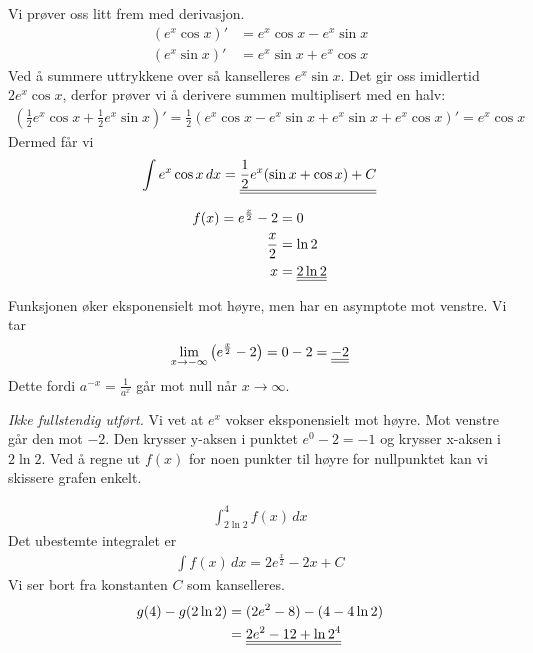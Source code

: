 \documentclass[a4paper,norsk,12pt]{article}
\begin{document}
Vi prøver oss litt frem med derivasjon.
\begin{align*}
  (e^x \cos{x})' &= e^x\cos{x} - e^x\sin{x} \\
  (e^x \sin{x})' &= e^x\sin{x} + e^x\cos{x}
\end{align*}
Ved å summere uttrykkene over så kanselleres $e^x\sin{x}$. Det gir oss
imidlertid $2e^x\cos{x}$, derfor prøver vi å derivere summen multiplisert med
en halv:
\begin{align*}
  \left( \frac{1}{2}e^x \cos{x} +
         \frac{1}{2}e^x \sin{x} \right)' =
    \frac{1}{2} \left( 
        e^x\cos{x}-e^x\sin{x} + e^x\sin{x} + e^x\cos{x}
      \right)' = e^x\cos{x}
\end{align*}
Dermed får vi
\begin{align*}
  \int{e^x\cos{x}} \,dx = 
  {\underline{\underline{ \frac{1}{2}e^x( \sin{x} + \cos{x} ) + C }}}
\end{align*}


\begin{align*}
  f(x) = e^\frac{x}{2} - 2 &= 0 \\
  \frac{x}{2} &= \ln{2} \\
  x &= {\underline{\underline{ 2\ln{2} }}}
\end{align*}

Funksjonen øker eksponensielt mot høyre, men har en asymptote mot venstre. Vi
tar
\begin{align*}
  \lim_{x\to -\infty}{\left( e^\frac{x}{2}-2 \right)} = 0 - 2 = {\underline{\underline{-2}}}
\end{align*}
Dette fordi $a^{-x} = \frac{1}{a^x}$ går mot null når $x\to\infty$.

\textit{Ikke fullstendig utført.}
Vi vet at $e^x$ vokser eksponensielt mot høyre. Mot venstre går den mot $-2$.
Den krysser y-aksen i punktet $e^0-2 = -1$ og krysser x-aksen i $2\ln{2}$. Ved
å regne ut $f(x)$ for noen punkter til høyre for nullpunktet kan vi skissere
grafen enkelt.

\begin{align*}
  \int_{2\ln{2}}^{4}f(x)\,dx
\end{align*}
Det ubestemte integralet er
\begin{align*}
  \int f(x) \,dx = 2e^\frac{x}{2} - 2x + C
\end{align*}
Vi ser bort fra konstanten $C$ som kanselleres.
\begin{align*}
  g(4) - g(2\ln{2}) & = (2e^2-8) - (4 - 4\ln{2}) \\
                    &= {\underline{\underline{2e^2 - 12 + \ln{2^4}}}}
\end{align*}
\end{document}
